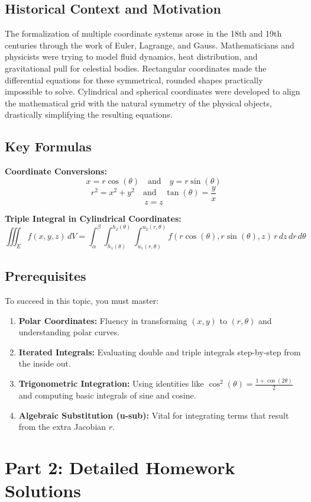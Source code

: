\documentclass[11pt]{article}
\begin{document}
\subsection{Historical Context and Motivation}
The formalization of multiple coordinate systems arose in the 18th and 19th centuries through the work of Euler, Lagrange, and Gauss. Mathematicians and physicists were trying to model fluid dynamics, heat distribution, and gravitational pull for celestial bodies. Rectangular coordinates made the differential equations for these symmetrical, rounded shapes practically impossible to solve. Cylindrical and spherical coordinates were developed to align the mathematical grid with the natural symmetry of the physical objects, drastically simplifying the resulting equations. 

\subsection{Key Formulas}
\textbf{Coordinate Conversions:}
\[ x = r \cos(\theta) \quad \text{and} \quad y = r \sin(\theta) \]
\[ r^2 = x^2 + y^2 \quad \text{and} \quad \tan(\theta) = \frac{y}{x} \]
\[ z = z \]

\textbf{Triple Integral in Cylindrical Coordinates:}
\[ \iiint_E f(x, y, z) \, dV = \int_{\alpha}^{\beta} \int_{h_1(\theta)}^{h_2(\theta)} \int_{u_1(r, \theta)}^{u_2(r, \theta)} f(r\cos(\theta), r\sin(\theta), z) \, r \, dz \, dr \, d\theta \]

\subsection{Prerequisites}
To succeed in this topic, you must master:
\begin{enumerate}
    \item \textbf{Polar Coordinates:} Fluency in transforming $(x,y)$ to $(r,\theta)$ and understanding polar curves.
    \item \textbf{Iterated Integrals:} Evaluating double and triple integrals step-by-step from the inside out.
    \item \textbf{Trigonometric Integration:} Using identities like $\cos^2(\theta) = \frac{1 + \cos(2\theta)}{2}$ and computing basic integrals of sine and cosine.
    \item \textbf{Algebraic Substitution (u-sub):} Vital for integrating terms that result from the extra Jacobian $r$.
\end{enumerate}

\newpage
\section{Part 2: Detailed Homework Solutions}
\end{document}
